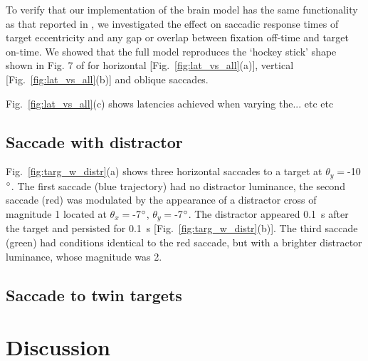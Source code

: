\documentclass{frontiersSCNS}
\begin{document}
To verify that our implementation of the brain model has the same
functionality as that reported in \cite{cope_basal_2017}, we 
investigated the effect on saccadic response times of
target eccentricity and any gap or overlap between fixation off-time 
and target on-time. We showed that the full model reproduces the 
`hockey stick' shape shown in Fig. 7 of \cite{cope_basal_2017} for
horizontal [Fig.~\ref{fig:lat_vs_all}(a)], vertical
[Fig.~\ref{fig:lat_vs_all}(b)] and oblique saccades.  

Fig.~\ref{fig:lat_vs_all}(c) shows latencies achieved when varying the... etc etc

\subsection{Saccade with distractor}

Fig.~\ref{fig:targ_w_distr}(a) shows three horizontal saccades to a 
target at $\theta_{y}=$-10$\degree$. The first saccade (blue 
trajectory) had no distractor luminance, the second saccade (red) was
modulated by the appearance of a distractor cross of magnitude 1
located at $\theta_{x}=$-7$\degree$, $\theta_{y}=$-7$\degree$. 
The distractor appeared 0.1~s after the target and 
persisted for 0.1~s [Fig.~\ref{fig:targ_w_distr}(b)]. The third 
saccade (green) had conditions identical to the red saccade, but 
with a brighter distractor luminance, whose magnitude was 2.

\subsection{Saccade to twin targets}

\section{Discussion}


\end{document}
